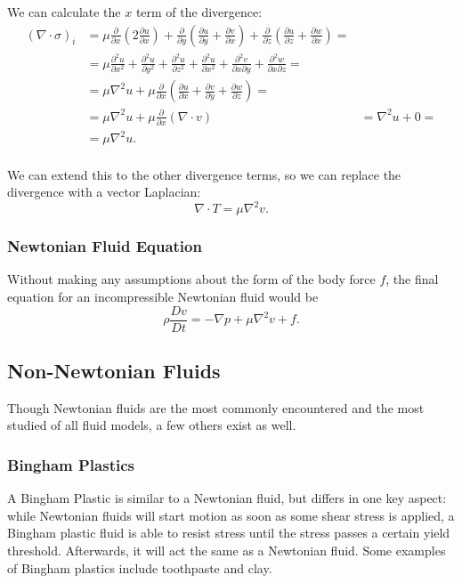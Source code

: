 \documentclass[a4paper,twocolumn]{article}
\begin{document}
We can calculate the $x$ term of the divergence:
\begin{align*}
(\nabla\cdot\sigma)_i &= \mu\frac{\partial}{\partial x}(2\frac{\partial u}{\partial x}) + \frac{\partial}{\partial y}(\frac{\partial u}{\partial y}+\frac{\partial v}{\partial x}) + \frac{\partial}{\partial z}(\frac{\partial u}{\partial z}+\frac{\partial w}{\partial x}) = \\
&= \mu\frac{\partial^2 u}{\partial x^2} + \frac{\partial^2 u}{\partial y^2} + \frac{\partial^2 u}{\partial z^2} + \frac{\partial^2 u}{\partial x^2} + \frac{\partial^2 v}{\partial x \partial y} + \frac{\partial^2 w}{\partial x \partial z} = \\
&= \mu\nabla^2 u + \mu\frac{\partial}{\partial x}(\frac{\partial u}{\partial x} + \frac{\partial v}{\partial y} + \frac{\partial w}{\partial z}) = \\
&= \mu\nabla^2 u + \mu\frac{\partial}{\partial x}(\nabla\cdot v) 
&= \nabla^2 u + 0 = \\
&= \mu\nabla^2 u.\\
\end{align*}

We can extend this to the other divergence terms, so we can replace the divergence with a vector Laplacian:
\[\nabla\cdot T = \mu \nabla^2 v.\]

\subsubsection{Newtonian Fluid Equation}
Without making any assumptions about the form of the body force $f$, the final equation for an incompressible Newtonian fluid would be
\[\rho\frac{Dv}{Dt} = -\nabla p + \mu \nabla^2 v + f.\]

\subsection{Non-Newtonian Fluids}

Though Newtonian fluids are the most commonly encountered and the most studied of all fluid models, a few others exist as well. 

\subsubsection{Bingham Plastics}
A Bingham Plastic is similar to a Newtonian fluid, but differs in one key aspect: while Newtonian fluids will start motion as soon as some shear stress is applied, a Bingham plastic fluid is able to resist stress until the stress passes a certain yield threshold. Afterwards, it will act the same as a Newtonian fluid. Some examples of Bingham plastics include toothpaste and clay. 
\end{document}
